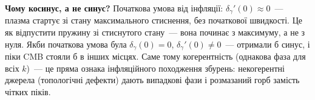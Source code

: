 \begin{keybox}
\textbf{Чому косинус, а не синус?}
Початкова умова від інфляції: $\delta_\gamma'(0) \approx 0$~---
плазма стартує зі стану максимального стиснення, без
початкової швидкості. Це як відпустити пружину зі стиснутого
стану~--- вона починає з максимуму, а не з нуля.
Якби початкова умова була $\delta_\gamma(0) = 0$, $\delta_\gamma'(0) \neq 0$~---
отримали б синус, і піки CMB стояли б в інших місцях.
Саме тому когерентність (однакова фаза для всіх $k$)~---
це пряма ознака інфляційного походження збурень: некогерентні
джерела (топологічні дефекти) дають випадкові фази і
розмазаний горб замість чітких піків.
\end{keybox}

